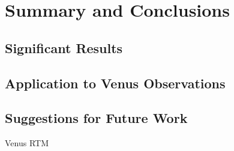 \chapter{Summary and Conclusions}
\section{Significant Results}
\section{Application to Venus Observations}
\section{Suggestions for Future Work}
Venus RTM